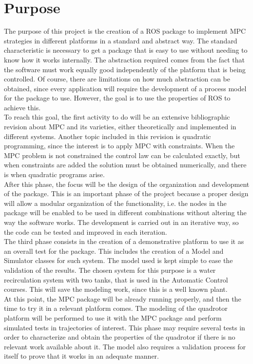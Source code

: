 \section{Purpose}
\label{chap:Purpose}

The purpose of this project is the creation of a ROS package to implement MPC strategies in different platforms in a standard and abstract way. The standard characteristic is necessary to get a package that is easy to use without needing to know how it works internally. The abstraction required comes from the fact that the software must work equally good independently of the platform that is being controlled. Of course, there are limitations on how much abstraction can be obtained, since every application will require the development of a process model for the package to use. However, the goal is to use the properties of ROS to achieve this.\\

To reach this goal, the first activity to do will be an extensive bibliographic revision about MPC and its varieties, either theoretically and implemented in different systems. Another topic included in this revision is quadratic programming, since the interest is to apply MPC with constraints. When the MPC problem is not constrained the control law can be calculated exactly, but when constraints are added the solution must be obtained numerically, and there is when quadratic programs arise. \\

After this phase, the focus will be the design of the organization and development of the package. This is an important phase of the project because a proper design will allow a modular organization of the functionality, i.e. the nodes in the package will be enabled to be used in different combinations without altering the way the software works. The development is carried out in an iterative way, so the code can be tested and improved in each iteration. \\

The third phase consists in the creation of a demonstrative platform to use it as an overall test for the package. This includes the creation of a Model and Simulator classes for such system. The model used is kept simple to ease the validation of the results. The chosen system for this purpose is a water recirculation system with two tanks, that is used in the Automatic Control courses. This will save the modeling work, since this is a well known plant. \\

At this point, the MPC package will be already running properly, and then the time to try it in a relevant platform comes. The modeling of the quadrotor platform will be performed to use it with the MPC package and perform simulated tests in trajectories of interest. This phase may require several tests in order to characterize and obtain the properties of the quadrotor if there is no relevant work available about it. The model also requires a validation process for itself to prove that it works in an adequate manner. 
